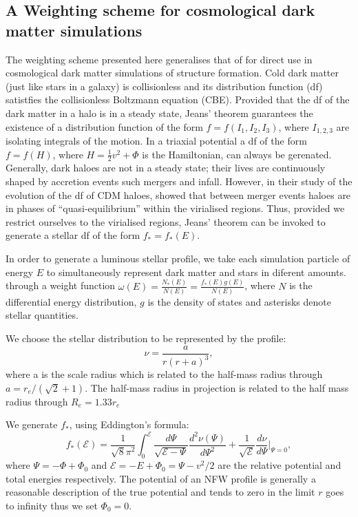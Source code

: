 \subsection{A Weighting scheme for cosmological dark matter simulations}
The weighting scheme presented here generalises that of \cite{Bullock2005} for direct use in cosmological dark matter simulations of structure formation. Cold dark matter (just like stars in a galaxy) is collisionless and its distribution function ({\sc df}) satistfies the collisionless Boltzmann equation (CBE). Provided that the {\sc df} of the dark matter in a halo is in a steady state, Jeans' theorem guarantees the existence of a distribution function of the form $f=f(I_{1}, I_{2}, I_{3})$, where $I_{1,2,3}$ are isolating integrals of the motion. In a triaxial potential a {\sc df} of the form $f=f(H)$, where $H=\frac{1}{2}v^{2}+\Phi$ is the Hamiltonian, can always be gerenated. Generally, dark haloes are not in a steady state; their lives are continuously shaped by accretion events such mergers and infall. However, in their study of the evolution of the {\sc df} of CDM haloes, \cite{Natarajan1997} showed that between merger events haloes are in phases of ``quasi-equilibrium'' within the virialised regions. Thus, provided we restrict ourselves to the virialised regions, Jeans' theorem can be invoked to generate a stellar {\sc df} of the form $f_{*}=f_{*}(E)$.

In order to generate a luminous stellar profile, we take each simulation particle of energy $E$ to simultaneously represent dark matter and stars in diferent amounts. through a weight function $\omega(E)=\frac{N_{*}(E)}{N(E)}=\frac{f_{*}(E)g(E)}{N(E)}$, where $N$ is the differential energy distribution, $g$ is the density of states and asterisks denote stellar quantities. %

We choose the stellar distribution to be represented by the \cite{Hernquist1990} profile:
\begin{equation}
\nu=\frac{a}{r\left(r+a\right)^3},
\end{equation}
where a is the scale radius which is related to the half-mass radius through $a=r_{e}/(\sqrt{2}+1)$. The half-mass radius in projection is related to the half mass radius through $R_{e}=1.33r_{e}$

We generate $f_{*}$, using Eddington's formula:
\begin{equation}
f_{*}(\mathcal{E})=\frac{1}{\sqrt{8}\pi^2} \int^{\mathcal{E}}_{0}\frac{d\Psi}{\sqrt{\mathcal{E}-\Psi}}\frac{d^2\nu(\Psi)}{d\Psi^2} + \frac{1}{\sqrt{\mathcal{E}}}\frac{d\nu}{d\Psi}\bigg|_{\Psi=0},
\end{equation}
 where  $\Psi=-\Phi+\Phi_{0}$ and $\mathcal{E}=-E+\Phi_{0}=\Psi-v^2/2$ are the relative potential and total energies respectively. The potential of an NFW profile is generally a reasonable description of the true potential and tends to zero in the limit $r$ goes to infinity thus we set $\Phi_{0}=0$.

